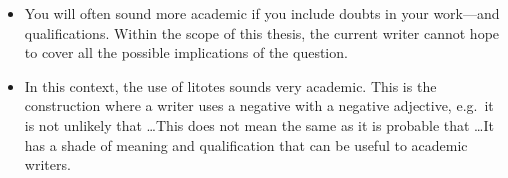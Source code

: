 \begin{itemize}
\item You will often sound more academic if you include doubts in your work---and qualifications.
Within the scope of this thesis, the current writer cannot hope to cover all the possible implications of the question.
\item In this context, the use of litotes sounds very academic.
This is the construction where a writer uses a negative with a negative adjective, e.g.\ it is not unlikely that \ldots This does not mean the same as it is probable that \ldots It has a shade of meaning and qualification that can be useful to academic writers.
\end{itemize}




